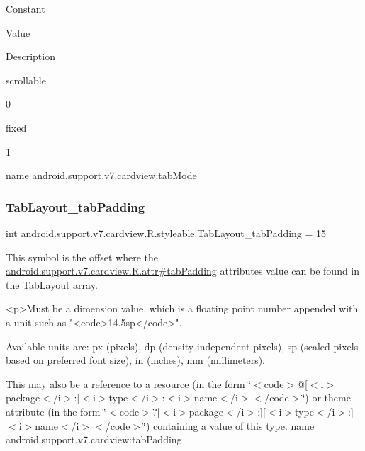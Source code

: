 Constant

Value

Description 

{\ttfamily scrollable}

0

{\ttfamily fixed}

1

name android.\+support.\+v7.\+cardview\+:tab\+Mode \mbox{\label{classandroid_1_1support_1_1v7_1_1cardview_1_1R_1_1styleable_adb8179e42e0e5cad97cc015e8c4569c0}} 
\subsubsection{\texorpdfstring{Tab\+Layout\+\_\+tab\+Padding}{TabLayout\_tabPadding}}
{\footnotesize\ttfamily int android.\+support.\+v7.\+cardview.\+R.\+styleable.\+Tab\+Layout\+\_\+tab\+Padding = 15\hspace{0.3cm}{\ttfamily [static]}}

This symbol is the offset where the \hyperlink{classandroid_1_1support_1_1v7_1_1cardview_1_1R_1_1attr_a212c434939a73d19c290434e3cb6c8e5}{android.\+support.\+v7.\+cardview.\+R.\+attr\#tab\+Padding} attribute\textquotesingle{}s value can be found in the \hyperlink{classandroid_1_1support_1_1v7_1_1cardview_1_1R_1_1styleable_afa0dc9366603eaec9e38d99273ba8512}{Tab\+Layout} array.

\begin{DoxyVerb}      <p>Must be a dimension value, which is a floating point number appended with a unit such as "<code>14.5sp</code>".
\end{DoxyVerb}
 Available units are\+: px (pixels), dp (density-\/independent pixels), sp (scaled pixels based on preferred font size), in (inches), mm (millimeters). 

This may also be a reference to a resource (in the form \char`\"{}$<$code$>$@\mbox{[}$<$i$>$package$<$/i$>$\+:\mbox{]}$<$i$>$type$<$/i$>$\+:$<$i$>$name$<$/i$>$$<$/code$>$\char`\"{}) or theme attribute (in the form \char`\"{}$<$code$>$?\mbox{[}$<$i$>$package$<$/i$>$\+:\mbox{]}\mbox{[}$<$i$>$type$<$/i$>$\+:\mbox{]}$<$i$>$name$<$/i$>$$<$/code$>$\char`\"{}) containing a value of this type.  name android.\+support.\+v7.\+cardview\+:tab\+Padding \mbox{\label{classandroid_1_1support_1_1v7_1_1cardview_1_1R_1_1styleable_ae40b7013d65d0b7702c09dc73558e5d1}} 
